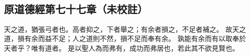 ﻿%
%

\chapter{~}

\section{原道德經第七十七章（未校註）}

\begin{withgezhu}

\zhsong


天之道，猶張弓者也。高者抑之，下者舉之；有余者損之，不足者補之。
故天之道，損有余而益不足；人之道則不然，損不足而奉有余。
孰能有余而有以取奉於天者乎？唯有道者。
是以聖人為而弗有，\textcolor{tongjia-color}{成功而弗居也}，若此其不欲見賢也。

\end{withgezhu}
